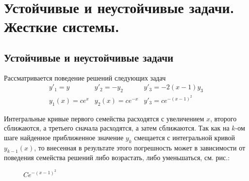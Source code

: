 \section{Устойчивые и неустойчивые задачи. Жесткие системы.}

\subsection*{Устойчивые и неустойчивые задачи}

Рассматривается поведение решений следующих задач
\[\begin{array}{ccc}
    y'_1=y      & y'_2=-y_2      & y'_3=-2(x-1)y_3    \\
    y_1(x)=ce^x & y_2(x)=ce^{-x} & y'_3=ce^{-(x-1)^2}
  \end{array}\]

Интегральные кривые первого семейства расходятся с увеличением $x$,
второго  сближаются, а третьего  сначала расходятся, а затем сближаются.
Так как на $k$-ом шаге найденное приближенное значение $y_k$ смещается с
интегральной кривой $y_{k-1}(x)$, то внесенная в результате этого
погрешность может в зависимости от поведения семейства решений
либо возрастать, либо уменьшаться, см. рис.:

\begin{figure}[h]
  \begin{minipage}{.3\linewidth}
    \centering
    \caption*{$Ce^x$}
  \end{minipage}\hfill
  \begin{minipage}{.3\linewidth}
    \centering
    \caption*{$Ce^{-x}$}
  \end{minipage}\hfill
  \begin{minipage}{.3\linewidth}
    \centering
    \caption*{$Ce^{-(x-1)^2}$}
  \end{minipage}
\end{figure}

